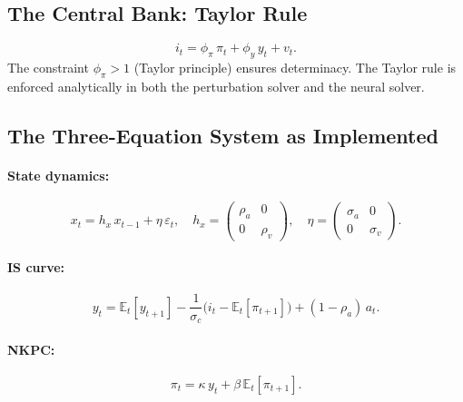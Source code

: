 \documentclass[11pt,a4paper]{article}
\theoremstyle{definition}
\newcommand{\E}{\mathbb{E}}
\begin{document}
	\subsection{The Central Bank: Taylor Rule}
	\label{sec:taylor_rule}
	
	\begin{equation}\label{eq:taylor_full}
		i_t = \phi_\pi \, \pi_t + \phi_y \, y_t + v_t.
	\end{equation}
	The constraint $\phi_\pi > 1$ (Taylor principle) ensures determinacy.
	The Taylor rule is enforced analytically in both the perturbation solver and the neural solver.
	
	\subsection{The Three-Equation System as Implemented}
	\label{sec:3eq_code}
	
	\paragraph{State dynamics:}
	\begin{equation}\label{eq:state_matrices}
		x_t = h_x \, x_{t-1} + \eta \, \varepsilon_t, \quad
		h_x = \begin{pmatrix} \rho_a & 0 \\ 0 & \rho_v \end{pmatrix}, \quad
		\eta = \begin{pmatrix} \sigma_a & 0 \\ 0 & \sigma_v \end{pmatrix}.
	\end{equation}
	
	\paragraph{IS curve:}
	\begin{equation}\label{eq:is_code}
		y_t = \E_t[y_{t+1}] - \frac{1}{\sigma_c}\bigl(i_t - \E_t[\pi_{t+1}]\bigr) + (1 - \rho_a)\, a_t.
	\end{equation}
	
	\paragraph{NKPC:}
	\begin{equation}\label{eq:nkpc_code}
		\pi_t = \kappa \, y_t + \beta \, \E_t[\pi_{t+1}].
	\end{equation}
	
\end{document}
